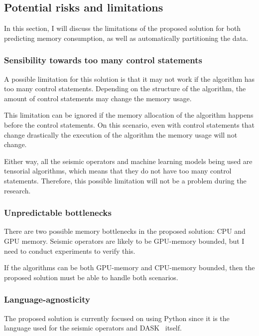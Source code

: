 \subsection{Potential risks and limitations}
\label{subsec:potential-risks-and-limitations}

In this section, I will discuss the limitations of the proposed solution for both predicting memory consumption, as well as automatically partitioning the data.

\subsubsection{Sensibility towards too many control statements}

A possible limitation for this solution is that it may not work if the algorithm has too many control statements.
Depending on the structure of the algorithm, the amount of control statements may change the memory usage.

This limitation can be ignored if the memory allocation of the algorithm happens before the control statements.
On this scenario, even with control statements that change drastically the execution of the algorithm the memory usage will not change.

Either way, all the seismic operators and machine learning models being used are tensorial algorithms, which means that they do not have too many control statements.
Therefore, this possible limitation will not be a problem during the research.

\subsubsection{Unpredictable bottlenecks}

There are two possible memory bottlenecks in the proposed solution: CPU and GPU memory.
Seismic operators are likely to be GPU-memory bounded, but I need to conduct experiments to verify this.

If the algorithms can be both GPU-memory and CPU-memory bounded, then the proposed solution must be able to handle both scenarios.

\subsubsection{Language-agnosticity}

The proposed solution is currently focused on using Python since it is the language used for the seismic operators and DASK~\cite{dask} itself.

